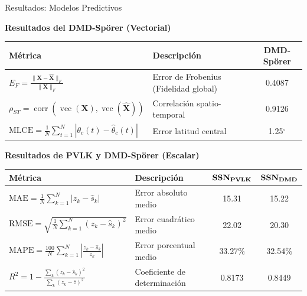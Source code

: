 \documentclass[aspectratio=169]{beamer}
\begin{document}
\begin{frame}{Resultados: Modelos Predictivos}
    \centering
    \small

    \scriptsize \textbf{Resultados del DMD-Spörer (Vectorial)}
    \renewcommand{\arraystretch}{1.2}
    \begin{table}
        \centering
        \scriptsize
        \begin{tabular}{l|l|c}
            \toprule
            \textbf{Métrica} & \textbf{Descripción} & \textbf{DMD-Spörer} \\ 
            \midrule
            $\textstyle E_F = \frac{\|\mathbf{X}-\widehat{\mathbf{X}}\|_F}{\|\mathbf{X}\|_F}$ & Error de Frobenius (Fidelidad global) & 0.4087 \\
            $\textstyle \rho_{ST} = \operatorname{corr}(\operatorname{vec}(\mathbf{X}),\operatorname{vec}(\widehat{\mathbf{X}}))$ & Correlación spatio-temporal & 0.9126 \\
            $\textstyle \mathrm{MLCE} = \frac{1}{N}\sum_{t=1}^{N}|\theta_c(t)-\widehat{\theta}_c(t)|$ & Error latitud central & 1.25$^\circ$ \\ 
            \bottomrule
        \end{tabular}
    \end{table}

    \vspace{0.05cm}

    \scriptsize \textbf{Resultados de PVLK y DMD-Spörer (Escalar)}
    \renewcommand{\arraystretch}{1.2}
    \begin{table}
        \centering
        \scriptsize
        \begin{tabular}{l|l|cc}
            \toprule
            \textbf{Métrica} & \textbf{Descripción} & $\text{\textbf{SSN}}_{\text{\textbf{PVLK}}}$ & $\text{\textbf{SSN}}_{\text{\textbf{DMD}}}$ \\ 
            \midrule
            $\textstyle \mathrm{MAE} = \frac{1}{N}\sum_{k=1}^{N}|z_k-\widehat{s}_k|$ & Error absoluto medio & 15.31 & 15.22 \\
            $\textstyle \mathrm{RMSE} = \sqrt{\frac{1}{N}\sum_{k=1}^{N}(z_k-\widehat{s}_k)^2}$ & Error cuadrático medio & 22.02 & 20.30 \\
            $\textstyle \mathrm{MAPE} = \frac{100}{N}\sum_{k=1}^{N}\left|\frac{z_k-\widehat{s}_k}{z_k}\right|$ & Error porcentual medio & 33.27\% & 32.54\% \\
            $\textstyle R^2 = 1-\frac{\sum_k(z_k-\widehat{s}_k)^2}{\sum_k(z_k-\bar{z})^2}$ & Coeficiente de determinación & 0.8173 & 0.8449 \\
            \bottomrule
        \end{tabular}
    \end{table}

\end{frame}
\end{document}
